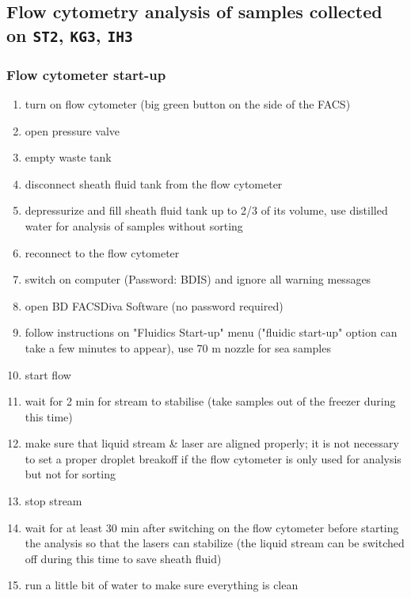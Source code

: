\subsection{Flow cytometry analysis of samples collected on \texttt{ST2}, \texttt{KG3}, \texttt{IH3}}
\label{task:20180204_cj0}

\subsubsection{Flow cytometer start-up}

\begin{enumerate}
\item turn on flow cytometer (big green button on the side of the FACS)
\item open pressure valve
\item empty waste tank
\item disconnect sheath fluid tank from the flow cytometer
\item depressurize and fill sheath fluid tank up to 2/3 of its volume, use distilled water for analysis of samples without sorting
\item reconnect to the flow cytometer
\item switch on computer (Password: BDIS) and ignore all warning messages
\item open BD FACSDiva Software (no password required)
\item follow instructions on "Fluidics Start-up" menu ("fluidic start-up" option can take a few minutes to appear), use 70 \textmu m nozzle for sea samples
\item start flow
\item wait for 2 min for stream to stabilise (take samples out of the freezer during this time)
\item make sure that liquid stream \& laser are aligned properly; it is not necessary to set a proper droplet breakoff if the flow cytometer is only used for analysis but not for sorting
\item stop stream
\item wait for at least 30 min after switching on the flow cytometer before starting the analysis so that the lasers can stabilize (the liquid stream can be switched off during this time to save sheath fluid)
\item run a little bit of water to make sure everything is clean
\end{enumerate}

